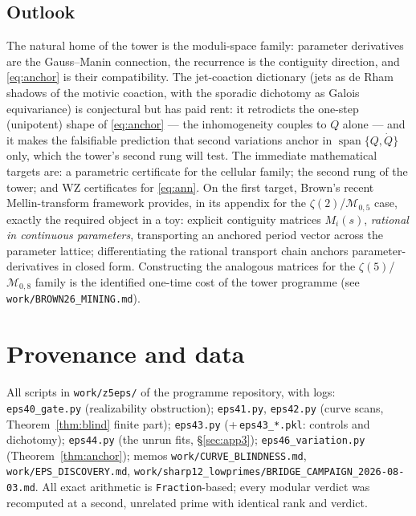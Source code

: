 \documentclass[11pt,reqno]{amsart}
\theoremstyle{plain}
\theoremstyle{definition}
\theoremstyle{remark}
\begin{document}
\subsection{Outlook}
The natural home of the tower is the moduli-space family: parameter
derivatives are the Gauss--Manin connection, the recurrence is the
contiguity direction, and \eqref{eq:anchor} is their compatibility. The
jet-coaction dictionary (jets as de Rham shadows of the motivic coaction,
with the sporadic dichotomy as Galois equivariance) is conjectural but has
paid rent: it retrodicts the one-step (unipotent) shape of
\eqref{eq:anchor} --- the inhomogeneity couples to $Q$ alone --- and it
makes the falsifiable prediction that second variations anchor in
$\operatorname{span}\{Q,\dot Q\}$ only, which the tower's second rung will
test. The immediate mathematical targets are: a parametric certificate for
the cellular family; the second rung of the tower; and WZ certificates for
\eqref{eq:ann}. On the first target, Brown's recent Mellin-transform
framework \cite{Br26} provides, in its appendix for the
$\zeta(2)$/$\mathcal M_{0,5}$ case, exactly the required object in a toy:
explicit contiguity matrices $M_i(s)$, \emph{rational in continuous
parameters}, transporting an anchored period vector across the parameter
lattice; differentiating the rational transport chain anchors
parameter-derivatives in closed form. Constructing the analogous matrices
for the $\zeta(5)$/$\mathcal M_{0,8}$ family is the identified one-time
cost of the tower programme (see \texttt{work/BROWN26\_MINING.md}).

\section{Provenance and data}\label{sec:provenance}

All scripts in \texttt{work/z5eps/} of the programme repository, with logs:
\texttt{eps40\_gate.py} (realizability obstruction);
\texttt{eps41.py}, \texttt{eps42.py} (curve scans, Theorem~\ref{thm:blind}
finite part); \texttt{eps43.py} (+\,\texttt{eps43\_*.pkl}: controls and
dichotomy); \texttt{eps44.py} (the unrun fits, §\ref{sec:app3});
\texttt{eps46\_variation.py} (Theorem~\ref{thm:anchor});
memos \texttt{work/CURVE\_BLINDNESS.md}, \texttt{work/EPS\_DISCOVERY.md},
\texttt{work/sharp12\_lowprimes/BRIDGE\_CAMPAIGN\_2026-08-03.md}. All exact
arithmetic is \texttt{Fraction}-based; every modular verdict was recomputed
at a second, unrelated prime with identical rank and verdict.
\end{document}
